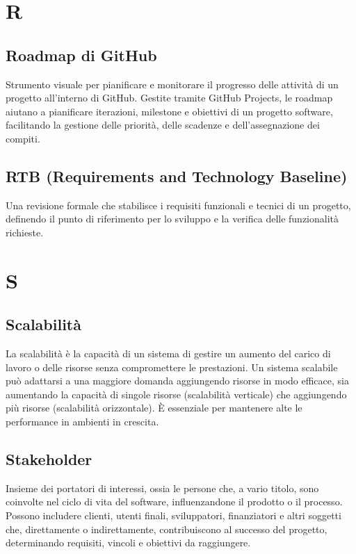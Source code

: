 \documentclass{article}
\begin{document}
\newpage

\section{R}

\subsection{Roadmap di GitHub}
Strumento visuale per pianificare e monitorare il progresso delle attività di un progetto all'interno di GitHub. Gestite tramite GitHub Projects, le roadmap aiutano a pianificare iterazioni, milestone e obiettivi di un progetto software, facilitando la gestione delle priorità, delle scadenze e dell'assegnazione dei compiti.

\subsection{RTB (Requirements and Technology Baseline)}
Una revisione formale che stabilisce i requisiti funzionali e tecnici di un progetto, definendo il punto di riferimento per lo sviluppo e la verifica delle funzionalità richieste.

\newpage
\section{S}

\subsection{Scalabilità}
La scalabilità è la capacità di un sistema di gestire un aumento del carico di lavoro o delle risorse senza compromettere le prestazioni. Un sistema scalabile può adattarsi a una maggiore domanda aggiungendo risorse in modo efficace, sia aumentando la capacità di singole risorse (scalabilità verticale) che aggiungendo più risorse (scalabilità orizzontale). È essenziale per mantenere alte le performance in ambienti in crescita.

\subsection{Stakeholder}
Insieme dei portatori di interessi, ossia le persone che, a vario titolo, sono coinvolte nel ciclo di vita del software, influenzandone il prodotto o il processo. Possono includere clienti, utenti finali, sviluppatori, finanziatori e altri soggetti che, direttamente o indirettamente, contribuiscono al successo del progetto, determinando requisiti, vincoli e obiettivi da raggiungere.
\end{document}
